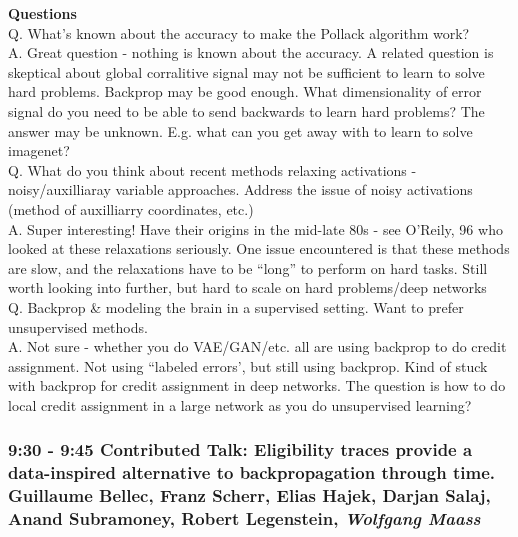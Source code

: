 \documentclass[12pt]{article}
\begin{document}
\textbf{Questions} \\

Q. What's known about the accuracy to make the Pollack algorithm work? \\

A. Great question - nothing is known about the accuracy. A related question is skeptical about global corralitive signal may not be sufficient to learn to solve hard problems. Backprop may be good enough. What dimensionality of error signal do you need to be able to send backwards to learn hard problems? The answer may be unknown. E.g. what can you get away with to learn to solve imagenet?  \\

Q. What do you think about recent methods relaxing activations - noisy/auxilliaray variable approaches. Address the issue of noisy activations (method of auxilliarry coordinates, etc.) \\

A. Super interesting! Have their origins in the mid-late 80s - see O'Reily, 96 who looked at these relaxations seriously. One issue encountered is that these methods are slow, and the relaxations have to be ``long'' to perform on hard tasks. Still worth looking into further, but hard to scale on hard problems/deep networks \\

Q. Backprop \& modeling the brain in a supervised setting. Want to prefer unsupervised methods. \\

A. Not sure - whether you do VAE/GAN/etc. all are using backprop to do credit assignment. Not using ``labeled errors', but still using backprop. Kind of stuck with backprop for credit assignment in deep networks. The question is how to do local credit assignment in a large network as you do unsupervised learning? \\


\subsubsection{9:30 - 9:45 Contributed Talk: Eligibility traces provide a data-inspired alternative to backpropagation through time. \textbf{Guillaume Bellec}, Franz Scherr, Elias Hajek, Darjan Salaj, Anand Subramoney, Robert Legenstein, \textit{Wolfgang Maass}}
\end{document}
